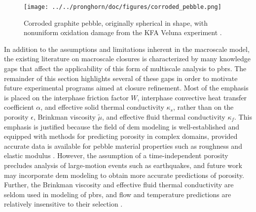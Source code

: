 
\begin{figure}[!h]
\centering
\texttt{[image: ../../pronghorn/doc/figures/corroded\_pebble.png]}
\caption{Corroded graphite pebble, originally spherical in shape, with nonuniform oxidation damage from the KFA Veluna experiment \cite{hassan_mev}.}
\label{fig:corroded_pebble}
\end{figure}


In addition to the assumptions and limitations inherent in the macroscale model, the existing literature on macroscale closures is characterized by many knowledge gaps that affect the applicability of this form of multiscale analysis to \glspl{pbr}. The remainder of this section highlights several of these gaps in order to motivate future experimental programs aimed at closure refinement. Most of the emphasis is placed on the interphase friction factor \(W\), interphase convective heat transfer coefficient \(\alpha\), and effective solid thermal conductivity \(\kappa_s\), rather than on the porosity \(\epsilon\), Brinkman viscosity \(\tilde{\mu}\), and effective fluid thermal conductivity \(\kappa_f\). This emphasis is justified because the field of \gls{dem} modeling is well-established and equipped with methods for predicting porosity in complex domains, provided accurate data is available for pebble material properties such as roughness and elastic modulus \cite{lammps,openfoam,liggghts,zhang2001}. However, the assumption of a time-independent porosity precludes analysis of large-motion events such as earthquakes, and future work may incorporate \gls{dem} modeling to obtain more accurate predictions of porosity. Further, the Brinkman viscosity and effective fluid thermal conductivity are seldom used in modeling of \glspl{pbr}, and flow and temperature predictions are relatively insensitive to their selection \cite{auwerda_2011,tecdoc1163}.

